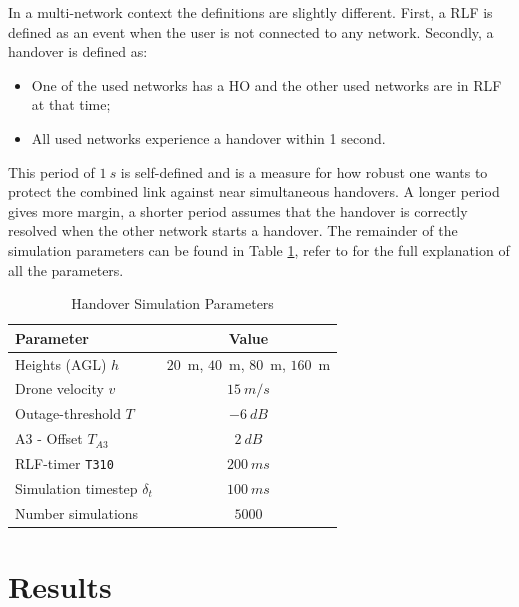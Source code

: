 \documentclass[conference,twocolumn,a4paper]{IEEEtran}
\begin{document}
\par In a multi-network context the definitions are slightly different. First, a RLF is defined as an event when the user is not connected to any network. Secondly, a handover is defined as:
\begin{itemize}
	\item One of the used networks has a HO and the other used networks are in RLF at that time;
	\item All used networks experience a handover within 1 second.
\end{itemize}
This period of $1~s$ is self-defined and is a measure for how robust one wants to protect the combined link against near simultaneous handovers. A longer period gives more margin, a shorter period assumes that the handover is correctly resolved when the other network starts a handover. The remainder of the simulation parameters can be found in Table \ref{tab:leuven_ho_stats}, refer to \cite{colpaert2020beamforming} for the full explanation of all the parameters.

\begin{table}[h!]
	\begin{center}
	  \caption{Handover Simulation Parameters}
	  \label{tab:leuven_ho_stats}
	  \begin{tabular}{|l|c|} %
		\hline
		\textbf{Parameter} & \textbf{Value}\\
		\hline
		Heights (AGL) $h$  & $20$~m, $40$~m, $80$~m, $160$~m\\
		Drone velocity $v$  & $15~m/s$\\
		Outage-threshold $T$ & $-6~dB$\\
		A3 - Offset $T_{A3}$ & $2~dB$\\
		RLF-timer \verb+T310+ & $200~ms$\\
		Simulation timestep $\delta_t$ & $100~ms$\\
		Number simulations & $5000$ \\
		\hline

	  \end{tabular}
	\end{center}
  \end{table}

\section{Results}
\end{document}

